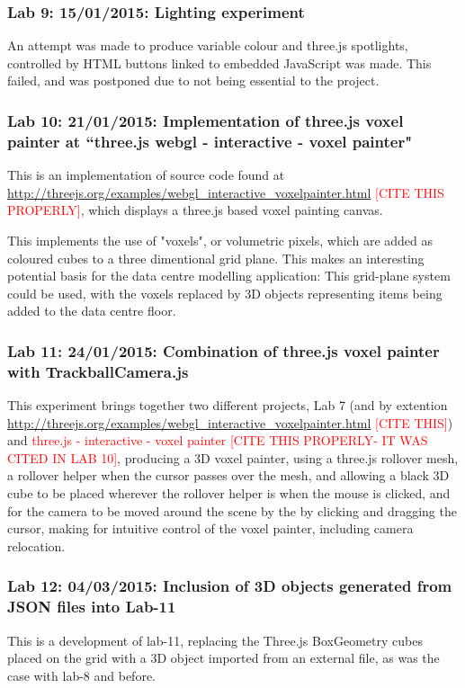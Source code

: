\subsubsection{Lab 9: 15/01/2015: Lighting experiment}
\label{subSubSec:ThreeJSExperiment:Lab9}
An attempt was made to produce variable colour and three.js spotlights, controlled by HTML buttons linked to embedded JavaScript was made. This failed, and was postponed due to not being essential to the project.

\subsubsection{Lab 10: 21/01/2015: Implementation of three.js voxel painter at ``three.js webgl - interactive - voxel painter"}
\label{subSubSec:ThreeJSExperiments:Lab10}
This is an implementation of source code found at \url{http://threejs.org/examples/webgl_interactive_voxelpainter.html} \textcolor{red}{[CITE THIS PROPERLY]}, which displays a three.js based voxel painting canvas.

This implements the use of "voxels", or volumetric pixels, which are added as coloured cubes to a three dimentional grid plane. This makes an interesting potential basis for the data centre modelling application: This grid-plane system could be used, with the voxels replaced by 3D objects representing items being added to the data centre floor.

\subsubsection{Lab 11: 24/01/2015: Combination of three.js voxel painter with TrackballCamera.js}
\label{subSubSec:ThreeJSExperiments:Lab11}
This experiment brings together two different projects, Lab 7 (and by extention \url{http://threejs.org/examples/webgl_interactive_voxelpainter.html} \textcolor{red}{[CITE THIS]}) and \textcolor{red}{three.js - interactive - voxel painter [CITE THIS PROPERLY- IT WAS CITED IN LAB 10]}, producing a 3D voxel painter, using a three.js rollover mesh, a rollover helper when the cursor passes over the mesh, and allowing a black 3D cube to be placed wherever the rollover helper is when the mouse is clicked, and for the camera to be moved around the scene by the by clicking and dragging the cursor, making for intuitive control of the voxel painter, including camera relocation.

\subsubsection{Lab 12: 04/03/2015: Inclusion of 3D objects generated from JSON files into Lab-11}
\label{subSubSec:ThreeJSExperiments:Lab12}
This is a development of lab-11, replacing the Three.js BoxGeometry cubes placed on the grid with a 3D object imported from an external file, as was the case with lab-8 and before.

